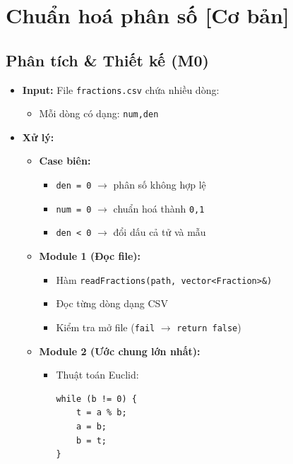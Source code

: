 \section{Chuẩn hoá phân số [Cơ bản]}
\subsection{Phân tích \& Thiết kế (M0)}
\begin{itemize}
    \item \textbf{Input:}
    File \texttt{fractions.csv} chứa nhiều dòng:
    \begin{itemize}
        \item Mỗi dòng có dạng: \texttt{num,den}
    \end{itemize}

    \item \textbf{Xử lý:}
    \begin{itemize}
        \item \textbf{Case biên:}
        \begin{itemize}
            \item \texttt{den = 0} $\rightarrow$ phân số không hợp lệ
            \item \texttt{num = 0} $\rightarrow$ chuẩn hoá thành \texttt{0,1}
            \item \texttt{den < 0} $\rightarrow$ đổi dấu cả tử và mẫu
        \end{itemize}

        \item \textbf{Module 1 (Đọc file):}
        \begin{itemize}
            \item Hàm \texttt{readFractions(path, vector<Fraction>\&)}
            \item Đọc từng dòng dạng CSV
            \item Kiểm tra mở file (\texttt{fail} $\rightarrow$ \texttt{return false})
        \end{itemize}

        \item \textbf{Module 2 (Ước chung lớn nhất):}
        \begin{itemize}
            \item Thuật toán Euclid:
            \begin{lstlisting}
while (b != 0) {
    t = a % b;
    a = b;
    b = t;
}
            \end{lstlisting}
        \end{itemize}


\end{itemize}
\end{itemize}
